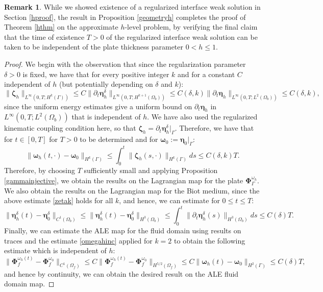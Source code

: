 \documentclass[11pt]{article}
\newcommand{\bd}{\boldsymbol}
\theoremstyle{definition}
\newtheorem{remark}{Remark}[section]
\begin{document}
\begin{remark}
While we showed existence of a regularized interface weak solution in Section \ref{hproof}, the result in Proposition \ref{geometryh} completes the proof of Theorem \ref{hthm} on the approximate $h$-level problem, by verifying the final claim that the time of existence $T > 0$ of the regularized interface weak solution can be taken to be independent of the plate thickness parameter $0 < h \le 1$.
\end{remark}

\begin{proof}
We begin with the observation that since the regularization parameter $\delta > 0$ is fixed, we have that for every positive integer $k$ and for a constant $C$ independent of $h$ (but potentially depending on $\delta$ and $k$):
\begin{equation}\label{zetak}
\|\bd{\zeta}_{h}\|_{L^{\infty}(0, T; H^{k}(\Gamma))} \le C \|\partial_{t}\bd{\eta}^{\delta}_{h}\|_{L^{\infty}(0, T; H^{k + 1}(\Omega_{b}))} \le C(\delta, k) \|\partial_{t}\bd{\eta}_{h}\|_{L^{\infty}(0, T; L^{2}(\Omega_{b}))} \le C(\delta, k),
\end{equation}
since the uniform energy estimates give a uniform bound on $\partial_{t}\bd{\eta}_{h}$ in $L^{\infty}(0, T; L^{2}(\Omega_{b}))$ that is independent of $h$. We have also used the regularized kinematic coupling condition here, so that $\bd{\zeta}_{h} = \partial_{t}\bd{\eta}^{\delta}_{h}|_{\Gamma}$. Therefore, we have that for $t \in [0, T]$ for $T > 0$ to be determined and for $\bd{\omega}_{0} := \bd{\eta}_{0}|_{\Gamma}$:
\begin{equation}\label{omegahinc}
\|\bd{\omega}_{h}(t, \cdot) - \bd{\omega}_{0}\|_{H^{k}(\Gamma)} \le \int_{0}^{t} \|\bd{\zeta}_{h}(s, \cdot)\|_{H^{k}(\Gamma)} ds \le C(\delta, k) T.
\end{equation}
Therefore, by choosing $T$ sufficiently small and applying Proposition \ref{gammainjective}, we obtain the results on the Lagrangian map for the plate $\bd{\Phi}^{\omega_{h}}_{\Gamma}$. We also obtain the results on the Lagrangian map for the Biot medium, since the above estimate \eqref{zetak} holds for all $k$, and hence, we can estimate for $0 \le t \le T$:
\begin{equation*}
\|\bd{\eta}_{h}^{\delta}(t) - \bd{\eta}^{\delta}_{0}\|_{C^{1}(\Omega_{b})} \le \|\bd{\eta}^{\delta}_{h}(t) - \bd{\eta}^{\delta}_{0}\|_{H^{3}(\Omega_{b})} \le \int_{0}^{t} \|\partial_{t}\bd{\eta}^{\delta}_{h}(s)\|_{H^{3}(\Omega_{b})} ds \le C(\delta) T.
\end{equation*}
Finally, we can estimate the ALE map for the fluid domain using results on traces and the estimate \eqref{omegahinc} applied for $k = 2$ to obtain the following estimate which is independent of $h$:
\begin{equation*}
\|\bd{\Phi}^{\omega_{h}(t)}_{f} - \bd{\Phi}^{\omega_{0}}_{f}\|_{C^{1}(\Omega_{f})} \le C\|\bd{\Phi}^{\omega_{h}(t)}_{f} - \bd{\Phi}^{\omega_{0}}_{f}\|_{H^{5/2}(\Omega_{f})} \le C\|\bd{\omega}_{h}(t) - \bd{\omega}_{0}\|_{H^{2}(\Gamma)} \le C(\delta) T,
\end{equation*}
and hence by continuity, we can obtain the desired result on the ALE fluid domain map. 
\end{proof}
\end{document}
